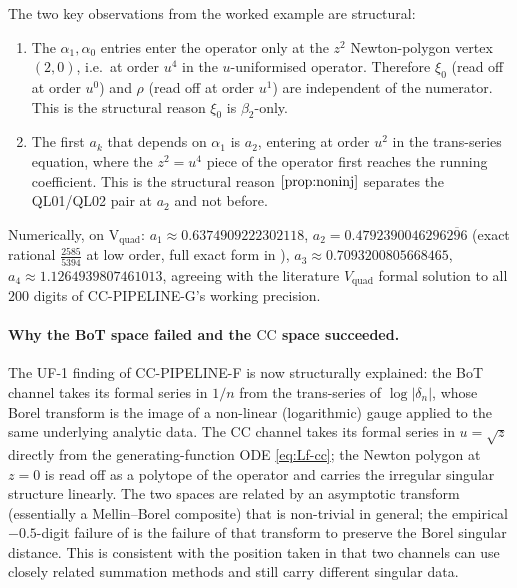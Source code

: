 \documentclass[11pt,reqno]{amsart}
\theoremstyle{plain}
\theoremstyle{definition}
\theoremstyle{remark}
\newcommand{\CC}{\mathrm{CC}}
\newcommand{\Vquad}{V_{\mathrm{quad}}}
\newcommand{\dn}{\delta_{n}}
\begin{document}
The two key observations from the worked example are
structural:

\begin{enumerate}
\item The $\alpha_1, \alpha_0$ entries enter the operator
only at the $z^2$ Newton-polygon vertex $(2, 0)$, i.e.\ at
order $u^4$ in the $u$-uniformised operator. Therefore
$\xi_0$ (read off at order $u^0$) and $\rho$ (read off at
order $u^1$) are independent of the numerator. This is the
structural reason $\xi_0$ is $\beta_2$-only.
\item The first $a_k$ that depends on $\alpha_1$ is $a_2$,
entering at order $u^2$ in the trans-series equation, where
the $z^2 = u^4$ piece of the operator first reaches the
running coefficient. This is the structural reason
$\Cref{prop:noninj}$ separates the QL01/QL02 pair at $a_2$
and not before.
\end{enumerate}

Numerically, on V$_\mathrm{quad}$:
$a_1 \approx 0.6374909222302118$,
$a_2 = 0.4792390046296\overline{296}$ (exact rational
$\frac{2585}{5394}$ at low order, full exact form in
\cite{siarc_cc_pipeline_g}),
$a_3 \approx 0.7093200805668465$,
$a_4 \approx 1.1264939807461013$, agreeing with the
literature $\Vquad$ formal solution to all $200$ digits of
CC-PIPELINE-G's working precision.

\paragraph{Why the BoT space failed and the $\CC$ space succeeded.}
The UF-1 finding of CC-PIPELINE-F
\cite{siarc_cc_pipeline_f} is now structurally explained:
the BoT channel takes its formal series in $1/n$ from the
trans-series of $\log|\dn|$, whose Borel transform is the
image of a non-linear (logarithmic) gauge applied to the
same underlying analytic data. The $\CC$ channel takes its
formal series in $u = \sqrt z$ directly from the
generating-function ODE \eqref{eq:Lf-cc}; the Newton polygon
at $z = 0$ is read off as a polytope of the operator and
carries the irregular singular structure linearly. The two
spaces are related by an asymptotic transform (essentially a
Mellin--Borel composite) that is non-trivial in general; the
empirical $-0.5$-digit failure of
\cite{siarc_cc_pipeline_f} is the failure of that transform
to preserve the Borel singular distance. This is consistent
with the position taken in  that
two channels can use closely related summation methods and
still carry different singular data.
\end{document}

